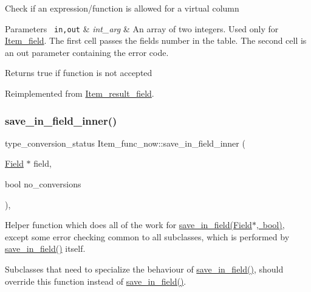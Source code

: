 Check if an expression/function is allowed for a virtual column


\begin{DoxyParams}[1]{Parameters}
\mbox{\texttt{ in,out}}  & {\em int\+\_\+arg} & An array of two integers. Used only for \mbox{\hyperlink{classItem__field}{Item\+\_\+field}}. The first cell passes the field\textquotesingle{}s number in the table. The second cell is an out parameter containing the error code.\\
\hline
\end{DoxyParams}
\begin{DoxyReturn}{Returns}
true if function is not accepted 
\end{DoxyReturn}


Reimplemented from \mbox{\hyperlink{classItem__result__field_a12324702e7f419b47de45e3505730441}{Item\+\_\+result\+\_\+field}}.

\mbox{\label{classItem__func__now_a8d1ad8eb628505c304c5e871c1c23dcc}} 
\subsubsection{\texorpdfstring{save\+\_\+in\+\_\+field\+\_\+inner()}{save\_in\_field\_inner()}}
{\footnotesize\ttfamily type\+\_\+conversion\+\_\+status Item\+\_\+func\+\_\+now\+::save\+\_\+in\+\_\+field\+\_\+inner (\begin{DoxyParamCaption}\item[{\mbox{\hyperlink{classField}{Field}} $\ast$}]{field,  }\item[{bool}]{no\+\_\+conversions }\end{DoxyParamCaption})\hspace{0.3cm}{\ttfamily [protected]}, {\ttfamily [virtual]}}

Helper function which does all of the work for \mbox{\hyperlink{classItem_acf4c1888a07e9e0dd5787283c6569545}{save\+\_\+in\+\_\+field(\+Field$\ast$, bool)}}, except some error checking common to all subclasses, which is performed by \mbox{\hyperlink{classItem_acf4c1888a07e9e0dd5787283c6569545}{save\+\_\+in\+\_\+field()}} itself.

Subclasses that need to specialize the behaviour of \mbox{\hyperlink{classItem_acf4c1888a07e9e0dd5787283c6569545}{save\+\_\+in\+\_\+field()}}, should override this function instead of \mbox{\hyperlink{classItem_acf4c1888a07e9e0dd5787283c6569545}{save\+\_\+in\+\_\+field()}}.


